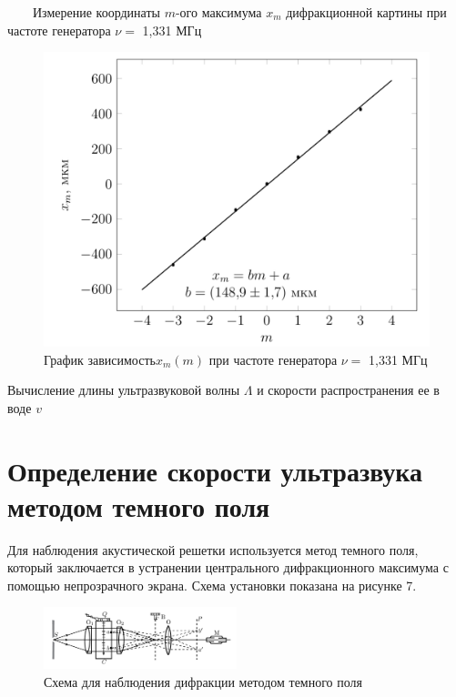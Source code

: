 \documentclass[journal, a4paper]{IEEEtran}
\begin{document}
	\begin{table}[h!]
	\centering
	
	\caption{~~~~Измерение координаты $ m $-ого максимума $ x_m $ дифракционной картины при частоте генератора $ \nu = $ 1,331 МГц}
	\label{nu4}
\end{table}	

\begin{figure}[h!]
	\centering
	\includegraphics[width=1.02\linewidth]{1.png}
	\caption{График зависимость$  x_m(m) $ при частоте генератора $ \nu = $ 1,331 МГц}
	\label{nu4_graf}
\end{figure}

	\begin{table}[h!]
	\centering
	
	\caption{Вычисление длины ультразвуковой волны $ \Lambda $ и скорости распространения ее в воде $ v $}
	\label{speed}
\end{table}	


\section{Определение скорости ультразвука методом темного поля}
	
Для наблюдения акустической решетки используется метод темного поля, который заключается в устранении центрального дифракционного максимума с помощью непрозрачного экрана. Схема установки показана на рисунке 7.

	\begin{figure}[h!]
	\centering	
	\includegraphics[width=0.5\textwidth]{shema2.png}
	\caption{Схема для наблюдения дифракции методом темного поля}
	\label{shema2}
\end{figure}
\end{document}
